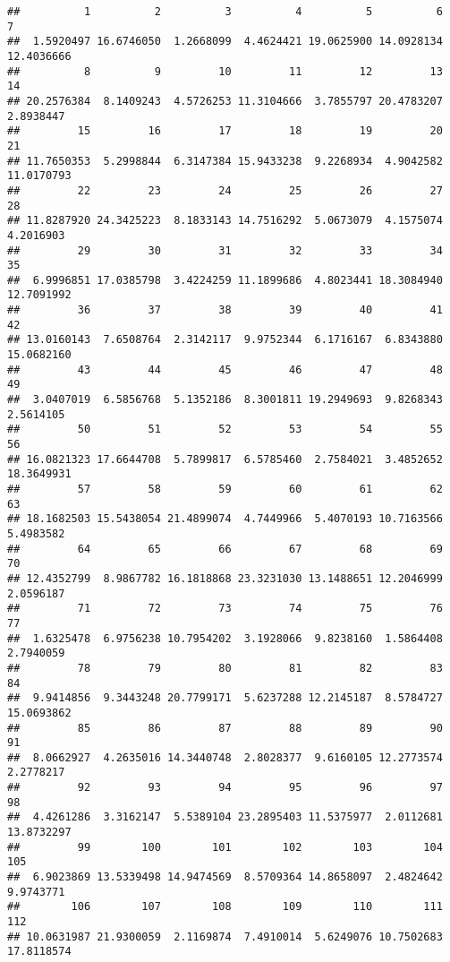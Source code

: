 \documentclass[
]{article}
\begin{document}
\begin{verbatim}
##          1          2          3          4          5          6          7 
##  1.5920497 16.6746050  1.2668099  4.4624421 19.0625900 14.0928134 12.4036666 
##          8          9         10         11         12         13         14 
## 20.2576384  8.1409243  4.5726253 11.3104666  3.7855797 20.4783207  2.8938447 
##         15         16         17         18         19         20         21 
## 11.7650353  5.2998844  6.3147384 15.9433238  9.2268934  4.9042582 11.0170793 
##         22         23         24         25         26         27         28 
## 11.8287920 24.3425223  8.1833143 14.7516292  5.0673079  4.1575074  4.2016903 
##         29         30         31         32         33         34         35 
##  6.9996851 17.0385798  3.4224259 11.1899686  4.8023441 18.3084940 12.7091992 
##         36         37         38         39         40         41         42 
## 13.0160143  7.6508764  2.3142117  9.9752344  6.1716167  6.8343880 15.0682160 
##         43         44         45         46         47         48         49 
##  3.0407019  6.5856768  5.1352186  8.3001811 19.2949693  9.8268343  2.5614105 
##         50         51         52         53         54         55         56 
## 16.0821323 17.6644708  5.7899817  6.5785460  2.7584021  3.4852652 18.3649931 
##         57         58         59         60         61         62         63 
## 18.1682503 15.5438054 21.4899074  4.7449966  5.4070193 10.7163566  5.4983582 
##         64         65         66         67         68         69         70 
## 12.4352799  8.9867782 16.1818868 23.3231030 13.1488651 12.2046999  2.0596187 
##         71         72         73         74         75         76         77 
##  1.6325478  6.9756238 10.7954202  3.1928066  9.8238160  1.5864408  2.7940059 
##         78         79         80         81         82         83         84 
##  9.9414856  9.3443248 20.7799171  5.6237288 12.2145187  8.5784727 15.0693862 
##         85         86         87         88         89         90         91 
##  8.0662927  4.2635016 14.3440748  2.8028377  9.6160105 12.2773574  2.2778217 
##         92         93         94         95         96         97         98 
##  4.4261286  3.3162147  5.5389104 23.2895403 11.5375977  2.0112681 13.8732297 
##         99        100        101        102        103        104        105 
##  6.9023869 13.5339498 14.9474569  8.5709364 14.8658097  2.4824642  9.9743771 
##        106        107        108        109        110        111        112 
## 10.0631987 21.9300059  2.1169874  7.4910014  5.6249076 10.7502683 17.8118574 

\end{verbatim}
\end{document}
